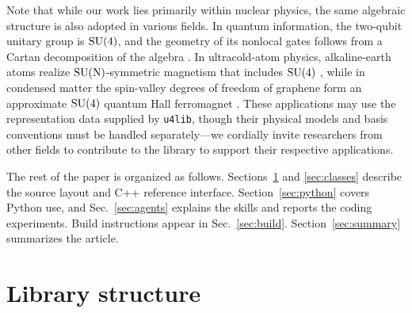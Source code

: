 \documentclass[aps,onecolumn,10pt,superscriptaddress,floatfix,nofootinbib]{revtex4}
\begin{document}
Note that while our work lies primarily within nuclear physics, the same algebraic structure is also
adopted in various fields. In quantum information, the two-qubit
unitary group is $\rm SU(4)$, and the geometry of its nonlocal gates follows from
a Cartan decomposition of the algebra \cite{Zhang2003PRA}. In ultracold-atom
physics, alkaline-earth atoms realize $\rm SU(N)$-symmetric magnetism that
includes $\rm SU(4)$ \cite{Gorshkov2010NP}, while in condensed matter the
spin-valley degrees of freedom of graphene form an approximate $\rm SU(4)$
quantum Hall ferromagnet \cite{Young2012NP}. These applications may use the 
representation data supplied by \texttt{u4lib}, though their physical models 
and basis conventions must be handled separately---we cordially invite researchers
from other fields to contribute to the library to support their respective applications.

The rest of the paper is organized as follows.
Sections~\ref{sec:structure} and \ref{sec:classes} describe the source layout
and C++ reference interface. Section~\ref{sec:python} covers Python use, and
Sec.~\ref{sec:agents} explains the skills and reports the coding experiments.
Build instructions appear in Sec.~\ref{sec:build}. Section~\ref{sec:summary}
summarizes the article.

\section{Library structure}
\label{sec:structure}
\end{document}
